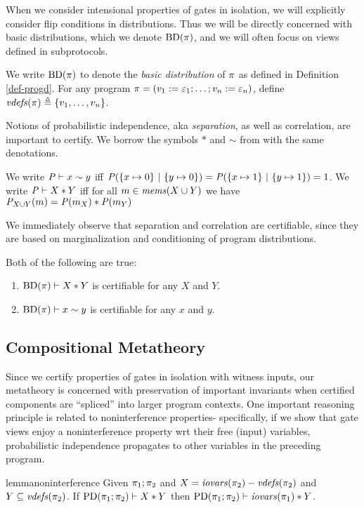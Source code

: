 When we consider intensional properties
of gates in isolation, we will explicitly consider flip conditions in
distributions. Thus we will be directly concerned with basic distributions,
which we denote $\mathrm{BD}(\pi)$, and we will often focus on views
defined in subprotocols. 
\begin{definition}
  We write $\mathrm{BD}(\pi)$ to denote the \emph{basic distribution} of
  $\pi$ as defined in Definition \ref{def-progd}. For any program $\pi =
  (v_1 := \varepsilon_1;\ldots;v_n := \varepsilon_n)$, define
  $\mathit{vdefs}(\pi) \triangleq \{ v_1,\ldots,v_n \}$.
\end{definition}
Notions of probabilistic independence, aka \emph{separation}, as well
as correlation, are important to certify. We borrow the symbols $*$
and $\sim$ from \cite{barthe2019probabilistic} with the same
denotations.
\begin{definition}
  We write $\mathit{P} \vdash x \sim y$ iff $\mathit{P}(\{ x \mapsto 0\}\ |\ \{ y \mapsto 0 \}) =
  \mathit{P}(\{ x \mapsto 1\}\ |\ \{ y \mapsto 1 \}) = 1$.
  We write $\mathit{P} \vdash X * Y$ iff for all
    $m \in \mathit{mems}(X \cup Y)$ we have
  ${\mathit{P}}_{X \cup Y}(m) =
  \mathit{P}(m_X) * \mathit{P}(m_Y)$
\end{definition}
We immediately observe that separation and correlation are certifiable,
since they are based on marginalization and conditioning of program
distributions. 
\begin{lemma}
  Both of the following are true:
  \begin{enumerate}
  \item $\mathrm{BD}(\pi) \vdash X * Y$ is certifiable for any $X$ and $Y$.
  \item $\mathrm{BD}(\pi) \vdash x \sim y$ is certifiable for any $x$ and $y$.
  \end{enumerate}
\end{lemma}

\subsection{Compositional Metatheory}

Since we certify properties of gates in isolation with witness inputs,
our metatheory is concerned with preservation of important invariants
when certified components are ``spliced'' into larger program
contexts.  One important reasoning principle is related to
noninterference properties- specifically, if we show that gate views
enjoy a noninterference property wrt their free (input) variables,
probabilistic independence propagates to other variables in the
preceding program.
\begin{restatable}[Noninterference]{lemma}{noninterference}
  \label{lemma-noninterference}
  Given $\pi_1;\pi_2$ and $X = \mathit{iovars}(\pi_2) - \mathit{vdefs}(\pi_2)$ and
  $Y \subseteq \mathit{vdefs}(\pi_2)$. If $\mathrm{PD}(\pi_1;\pi_2) \vdash X * Y$
  then $\mathrm{PD}(\pi_1;\pi_2) \vdash \mathit{iovars}(\pi_1) * Y$.
\end{restatable}

